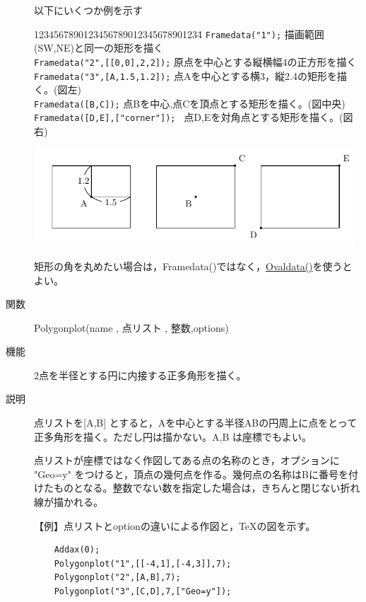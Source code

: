 \documentclass[papersize,a4paper,12pt,uplatex]{jsarticle}
\begin{document}
\begin{description}
以下にいくつか例を示す
\begin{tabbing}
1234567890123456789012345678901234\=\kill
  \verb|Framedata("1");|  \> 描画範囲(SW,NE)と同一の矩形を描く\\
  \verb|Framedata("2",[[0,0],2,2]);|   \> 原点を中心とする縦横幅4の正方形を描く\\
  \verb|Framedata("3",[A,1.5,1.2]);|  \> 点Aを中心とする横3，縦2.4の矩形を描く。(図左)\\
  \verb|Framedata([B,C]);|                  \> 点Bを中心,点Cを頂点とする矩形を描く。(図中央)\\
  \verb|Framedata([D,E],["corner"]); |        \>  点D,Eを対角点とする矩形を描く。(図右)
 \end{tabbing}
\begin{center}\includegraphics[bb=0.00 0.00 348.15 106.16,width=12cm]{Fig/Framedata.pdf}\end{center}

矩形の角を丸めたい場合は，Framedata()ではなく，\hyperlink{ovaldata}{Ovaldata()}を使うとよい。
 
\vspace{\baselineskip}
\hypertarget{polygonplot}{}
\item[関数]  Polygonplot(name , 点リスト , 整数,options)
\item[機能]  2点を半径とする円に内接する正多角形を描く。
\item[説明]  点リストを[A,B] とすると，Aを中心とする半径ABの円周上に点をとって正多角形を描く。ただし円は描かない。A,B は座標でもよい。

点リストが座標ではなく作図してある点の名称のとき，オプションに  "Geo=y" をつけると，頂点の幾何点を作る。幾何点の名称はBに番号を付けたものとなる。整数でない数を指定した場合は，きちんと閉じない折れ線が描かれる。

\vspace{\baselineskip}
【例】点リストとoptionの違いによる作図と，TeXの図を示す。

\begin{verbatim}
    Addax(0);
    Polygonplot("1",[[-4,1],[-4,3]],7);
    Polygonplot("2",[A,B],7);
    Polygonplot("3",[C,D],7,["Geo=y"]);
\end{verbatim}


\end{description}
\end{document}
